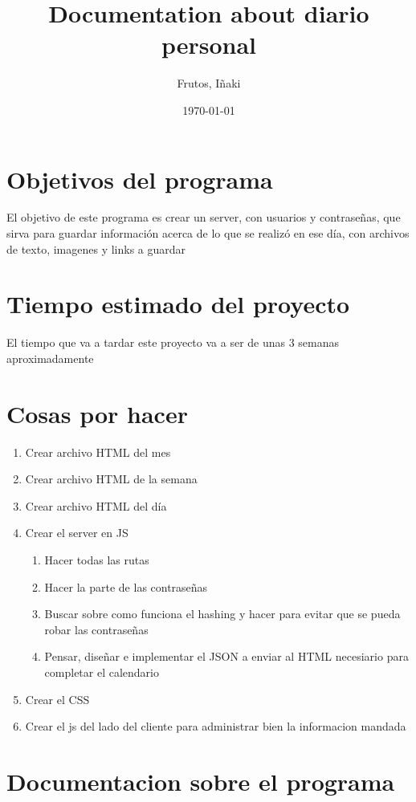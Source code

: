 \documentclass[12pt]{article}
\title{Documentation about diario personal}
\author{Frutos, I\~{n}aki}
\date{\today}
\begin{document}
\maketitle
\tableofcontents

\section{Objetivos del programa}
\begin{normalsize}
 El objetivo de este programa es crear un server, con usuarios 	y contraseñas, que sirva para guardar información acerca de lo que se realizó en ese día, con archivos de texto, imagenes y 	links a guardar
 \end{normalsize}
\section{Tiempo estimado del proyecto}
	El tiempo que va a tardar este proyecto va a ser de unas 3 			semanas aproximadamente
\section{Cosas por hacer}
	\begin{enumerate}
		\item Crear archivo HTML del mes
		\item Crear archivo HTML de la semana
		\item Crear archivo HTML del día
		\item Crear el server en JS
		\begin{enumerate}
			\item Hacer todas las rutas
			\item Hacer la parte de las contraseñas
			\item Buscar sobre como funciona el hashing y hacer para evitar que se pueda robar las contraseñas
			\item Pensar, diseñar e implementar el JSON a enviar al HTML necesiario para completar el calendario
		\end{enumerate}
		\item Crear el CSS
		\item Crear el js del lado del cliente para administrar bien la informacion mandada
	\end{enumerate}
	
\section{Documentacion sobre el programa}
	
	
\end{document}

